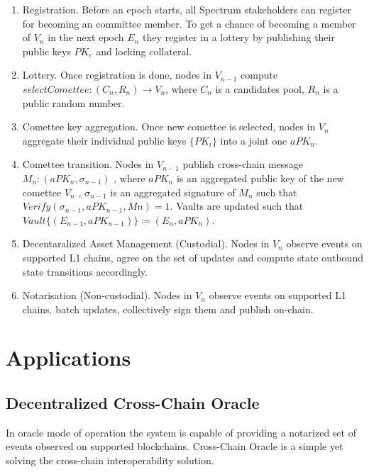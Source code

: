 \documentclass{article}
\begin{document}
    \begin{enumerate}
        \item Registration.
        Before an epoch starts, all Spectrum stakeholders can register for becoming an committee member.
        To get a chance of becoming a member of $V_n$ in the next epoch $E_n$ they register in a lottery
        by publishing their public keys $PK_c$ and locking collateral.
        \item Lottery.
        Once registration is done, nodes in $V_{n-1}$ compute $selectComettee: (C_n, R_n) \rightarrow V_n$,
        where  $C_n$ is a candidates pool, $R_n$ is a public random number.
        \item Comettee key aggregation.
        Once new comettee is selected, nodes in $V_n$ aggregate their individual public keys $\{PK_i\}$ into
        a joint one $aPK_n$.
        \item Comettee transition.
        Nodes in $V_{n-1}$ publish cross-chain message $M_n : (aPK_n, \sigma_{n-1})$ , where $aPK_n$ is
        an aggregated public key of the new comettee $V_n$ , $\sigma_{n-1}$ is an aggregated signature of
        $M_n$ such that $Verify(\sigma_{n-1}, aPK_{n-1}, Mn) = 1$.
        Vaults are updated such that $Vault\{(E_{n-1}, aPK_{n-1})\} \coloneqq (E_n, aPK_n)$.
        \item Decentaralized Asset Management (Custodial).
        Nodes in $V_n$ observe events on supported L1 chains, agree on the set of updates
        and compute state outbound state transitions accordingly.
        \item Notarisation (Non-custodial).
        Nodes in $V_n$ observe events on supported L1 chains, batch updates, collectively sign them and
        publish on-chain.
    \end{enumerate}


    \section{Applications}\label{sec:applications}

    \subsection{Decentralized Cross-Chain Oracle}\label{subsec:cross-chain-oracle}
    In oracle mode of operation the system is capable of providing a notarized set of events observed on supported blockchains.
    Cross-Chain Oracle is a simple yet solving the cross-chain interoperability solution.
\end{document}
